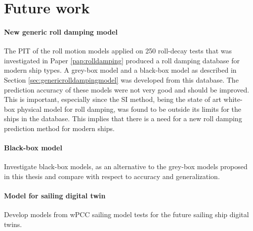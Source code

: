\chapter{Future work\label{ch:future_work}}

\subsubsection*{New generic roll damping model}
The PIT of the roll motion models applied on 250 roll-decay tests that was investigated in Paper \ref{pap:rolldamping} produced a roll damping database for modern ship types. A grey-box model and a black-box model as described in Section \ref{sec:genericrolldampingmodel} was developed from this database. The prediction accuracy of these models were not very good and should be improved. This is important, especially since the SI method, being the state of art white-box physical model for roll damping, was found to be outside its limits for the ships in the database. This implies that there is a need for a new roll damping prediction method for modern ships.  

\subsubsection*{Black-box model}
Investigate black-box models, as an alternative to the grey-box models proposed in this thesis and compare with respect to accuracy and generalization.

\subsubsection*{Model for sailing digital twin}
Develop models from wPCC sailing model tests for the future sailing ship digital twins.